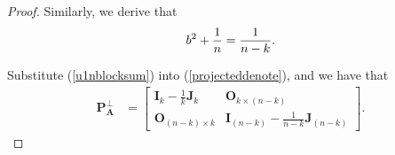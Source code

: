 \begin{proof}
 Similarly, we derive that 
\begin{align}
\notag
b^{2} + \frac 1n 
=
\frac{1}{n-k}.
\end{align}


Substitute (\ref{u1nblocksum})  into (\ref{projecteddenote}), and we have that 
\begin{align}\label{pup1n}
 \mathbf  P_{\mathbf  A }^{\bot}  
& =
\begin{bmatrix}
\mathbf I_{k} -\frac 1k \mathbf J_{k} &     \mathbf O_{k \times (n-k)}    \\
\mathbf O_{(n-k) \times k }    &   	\mathbf I_{(n-k)} - \frac {1}{n-k} \mathbf J_{(n-k)}
\end{bmatrix}.	
\end{align}


%
%
%

\end{proof}
